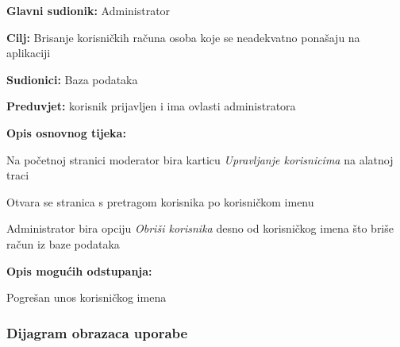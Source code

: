 					\noindent {}
					\begin{packed_item}
						
						\item \textbf{Glavni sudionik: }Administrator
						\item  \textbf{Cilj:} Brisanje korisničkih računa osoba koje se neadekvatno ponašaju na aplikaciji
						\item  \textbf{Sudionici:}
						Baza podataka
						\item  \textbf{Preduvjet:} korisnik prijavljen i ima ovlasti administratora
						\item  \textbf{Opis osnovnog tijeka:}
						
						\item[] \begin{packed_enum}
							
							\item	Na početnoj stranici moderator bira karticu \textit{Upravljanje korisnicima} na alatnoj traci
							\item	Otvara se stranica s pretragom korisnika po korisničkom imenu
							\item	Administrator bira opciju \textit{Obriši korisnika} desno od korisničkog imena što briše račun iz baze podataka
							
						\end{packed_enum}
						
						\item  \textbf{Opis mogućih odstupanja:}
						
						\item[] \begin{packed_item}
							
							\item[2.a] Pogrešan unos korisničkog imena
							
						\end{packed_item}
					\end{packed_item}
				\eject
					
				\subsubsection{Dijagram obrazaca uporabe} 
				
